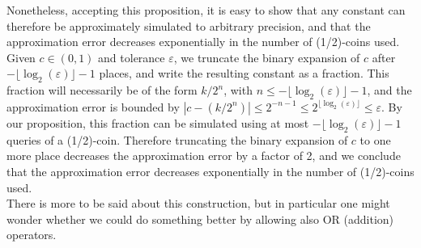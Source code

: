 \documentclass{article}
\theoremstyle{definition}
\newcommand{\OR}{{\footnotesize OR }}
\begin{document}
Nonetheless, accepting this proposition, it is easy to show that any constant can therefore be approximately simulated to arbitrary precision, and that the approximation error decreases exponentially in the number of (1/2)-coins used. Given $c \in (0,1)$ and tolerance $\varepsilon$, we truncate the binary expansion of $c$ after $-\lfloor\log_2(\varepsilon)\rfloor -1$ places, and write the resulting constant as a fraction. This fraction will necessarily be of the form $k/2^n$, with $n\leq -\lfloor\log_2(\varepsilon)\rfloor -1$, and the approximation error is bounded by $|c-(k/2^n)| \leq 2^{-n-1} \leq 2^{\lfloor\log_2(\varepsilon)\rfloor} \leq \varepsilon$.
By our proposition, this fraction can be simulated using at most $-\lfloor\log_2(\varepsilon)\rfloor -1$ queries of a (1/2)-coin. Therefore truncating the binary expansion of $c$ to one more place decreases the approximation error by a factor of 2, and we conclude that the approximation error decreases exponentially in the number of (1/2)-coins used.\\

There is more to be said about this construction, but in particular one might wonder whether we could do something better by allowing also \OR (addition) operators.


\end{document}
